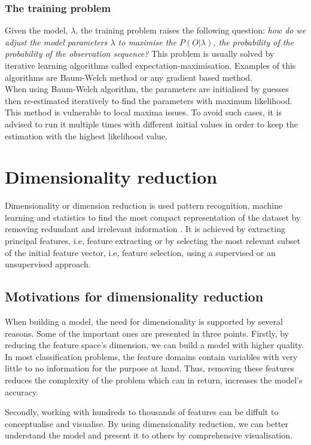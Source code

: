 \subsubsection{The training problem}
Given the model, \(\lambda\), the training problem raises the following question: \textit{how do we adjust the model parameters \(\lambda\) to maximise the \(P(O|\lambda)\), the probability of the probability of the observation sequence?}
This problem is usually solved by iterative learning algorithms called expectation-maximisation. Examples of this algorithms are Baum-Welch method or any gradient based method. \cite{tuto1989} \cite{tool2001} \cite{biol1998}
\\When using Baum-Welch algorithm, the parameters are initialised by guesses then re-estimated iteratively to find the parameters with maximum likelihood.
This method is vulnerable to local maxima issues. To avoid such cases, it is advised to run it multiple times with different initial values in order to keep the estimation with the highest likelihood value.

\section{Dimensionality reduction}
Dimensionality or dimension reduction is used pattern recognition, machine learning and statistics to find the most compact representation of the dataset by removing redundant and irrelevant information \cite{effi2016}.
It is achieved by extracting principal features, i.e, feature extracting or by selecting the most relevant subset of the initial feature vector, i.e, feature selection, using a supervised or an unsupervised approach.

\subsection{Motivations for dimensionality reduction}
When building a model, the need for dimensionality is supported by several reasons. Some of the important ones are presented in three points.
Firstly, by reducing the feature space's dimension, we can build a model with higher quality\cite{newh2016}.
In most classification problems, the feature domains contain variables with very little to no information for the purpose at hand.
Thus, removing these features reduces the complexity of the problem which can in return, increases the model's accuracy.

Secondly, working with hundreds to thousands of features can be diffult to conceptualise and visualise. By using dimensionality reduction, we can better understand the model and present it to others by comprehensive visualisation\cite{newh2016}.

